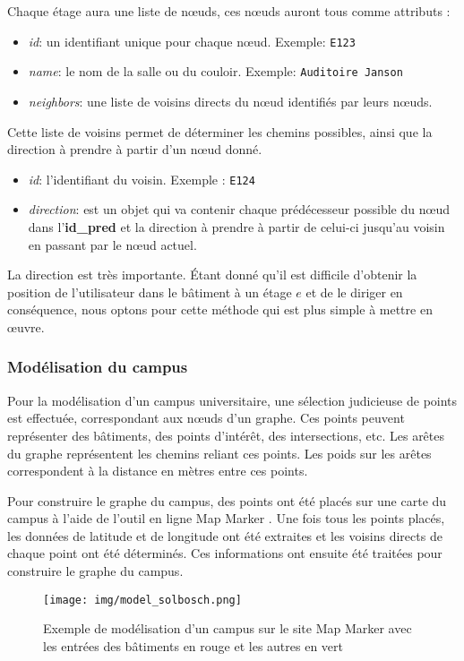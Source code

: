 \documentclass[journal, a4paper]{IEEEtran}
\begin{document}
Chaque étage aura une liste de nœuds, ces nœuds auront tous comme attributs :  
\begin{itemize}
	\item \textit{id}: un identifiant unique pour chaque nœud. Exemple: \texttt{E123}
	\item \textit{name}: le nom de la salle ou du couloir. Exemple: \texttt{Auditoire Janson}
	\item \textit{neighbors}: une liste de voisins directs du nœud identifiés par leurs nœuds.
\end{itemize}


Cette liste de voisins permet de déterminer les chemins possibles, ainsi que la direction à prendre à partir d'un nœud donné. 
\begin{itemize}
	\item \textit{id}: l'identifiant du voisin. Exemple : \texttt{E124}
	\item \textit{direction}: est un objet qui va contenir chaque prédécesseur possible du nœud dans l'\textbf{id\_pred} et la direction à prendre 
		à partir de celui-ci jusqu'au voisin en passant par le nœud actuel.
\end{itemize}

La direction est très importante. Étant donné qu'il est difficile d'obtenir la position 
de l'utilisateur dans le bâtiment à un étage $e$ et de le diriger en conséquence, nous optons pour cette méthode qui est plus simple à mettre en œuvre.

\vspace{0.5cm}

\subsubsection{Modélisation du campus}
Pour la modélisation d'un campus universitaire, une sélection judicieuse de points est effectuée, correspondant aux nœuds 
d'un graphe. Ces points peuvent représenter des bâtiments, des points d'intérêt, des intersections, etc. Les arêtes du 
graphe représentent les chemins reliant ces points. Les poids sur les arêtes correspondent à la distance en mètres entre 
ces points.

Pour construire le graphe du campus, des points ont été placés sur une carte du campus à l'aide de l'outil en ligne 
Map Marker \cite{mapmarker}. Une fois tous les points placés, les données de latitude et de longitude 
ont été extraites et les voisins directs de chaque point ont été déterminés. Ces informations ont ensuite été traitées 
pour construire le graphe du campus.
\begin{figure}[h]
	\center
	\texttt{[image: img/model\_solbosch.png]}
	\caption{Exemple de modélisation d'un campus sur le site Map Marker avec les entrées des bâtiments en rouge et les autres en vert}
\end{figure}
\end{document}
